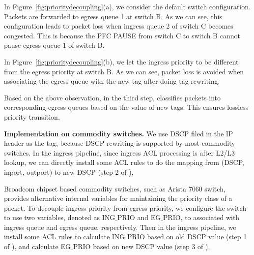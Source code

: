  In Figure~\ref{fig:prioritydecoupling}(a), we consider the default switch configuration. Packets are forwarded to egress queue 1 at switch B. As we can see, this configuration leads to packet loss when ingress queue 2 of switch C becomes congested. This is because the PFC PAUSE from switch C to switch B cannot pause  egress queue 1 of switch B. 
 
 In Figure~\ref{fig:prioritydecoupling}(b), we let the ingress priority to be different from the egress priority at switch B. As we can see, packet loss is avoided when associating the egress queue with the new tag after doing tag rewriting.
 
 Based on the above observation, in the third step, \sysname{} classifies packets into corresponding egress queues based on the value of new tags. This ensures lossless priority transition.
 
 \textbf{\sysname{} Implementation on commodity switches.} We use DSCP filed in the IP header as the tag, because DSCP rewriting is supported by most commodity switches. In the ingress pipeline, since ingress ACL processing is after L2/L3 lookup, we can directly install some ACL rules to do the mapping from (DSCP, inport, outport) to new DSCP (step 2 of \sysname{}).
 
 Broadcom chipset based commodity switches, such as Arista 7060 switch, provides alternative internal variables for maintaining the priority class of a packet. To decouple ingress priority from  egress priority, we configure the switch to use two variables, denoted as ING$\_$PRIO and EG$\_$PRIO, to associated with ingress queue and egress queue, respectively. Then in the ingress pipeline, we install some ACL rules to calculate ING$\_$PRIO based on old DSCP value (step 1 of \sysname{}), and calculate EG$\_$PRIO based on new DSCP value (step 3 of \sysname{}).
  

%	
%	
%
%


